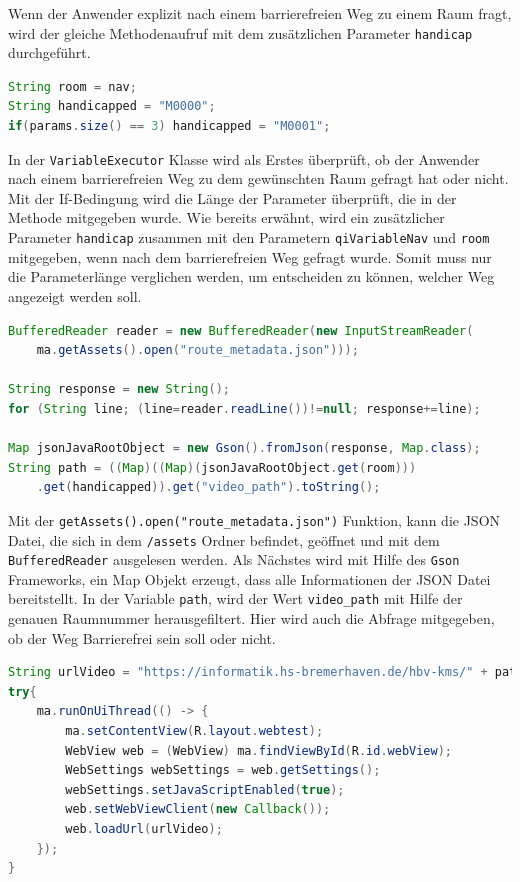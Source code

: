 Wenn der Anwender explizit nach einem barrierefreien Weg zu einem Raum fragt, wird der gleiche Methodenaufruf mit dem zusätzlichen Parameter \verb|handicap| durchgeführt.\\

\begin{lstlisting}[language=Java, caption={Optioanle Barrierefreiheit}]
String room = nav;
String handicapped = "M0000";
if(params.size() == 3) handicapped = "M0001";
\end{lstlisting}


In der \verb|VariableExecutor| Klasse wird als Erstes überprüft, ob der Anwender nach einem barrierefreien Weg zu dem gewünschten Raum gefragt hat oder nicht. Mit der If-Bedingung wird die Länge der Parameter überprüft, die in der Methode mitgegeben wurde. Wie bereits erwähnt, wird ein zusätzlicher Parameter \verb|handicap| zusammen mit den Parametern \verb|qiVariableNav| und \verb|room| mitgegeben, wenn nach dem barrierefreien Weg gefragt wurde. Somit muss nur die Parameterlänge verglichen werden, um entscheiden zu können, welcher Weg angezeigt werden soll.\\

\begin{lstlisting}[language=Java, caption={Auslesen der Routenfinder Daten}]
BufferedReader reader = new BufferedReader(new InputStreamReader(
    ma.getAssets().open("route_metadata.json")));

String response = new String();
for (String line; (line=reader.readLine())!=null; response+=line);

Map jsonJavaRootObject = new Gson().fromJson(response, Map.class);
String path = ((Map)((Map)(jsonJavaRootObject.get(room)))
    .get(handicapped)).get("video_path").toString();
\end{lstlisting}

Mit der \verb|getAssets().open("route_metadata.json")| Funktion, kann die JSON Datei, die sich in dem \verb|/assets| Ordner befindet, geöffnet und mit dem \verb|BufferedReader| ausgelesen werden. Als Nächstes wird mit Hilfe des \verb|Gson| Frameworks, ein Map Objekt erzeugt, dass alle Informationen der JSON Datei bereitstellt. In der Variable \verb|path|, wird der Wert 
\verb|video_path| mit Hilfe der genauen Raumnummer herausgefiltert. Hier wird auch die Abfrage mitgegeben, ob der Weg Barrierefrei sein soll oder nicht.\\


\begin{lstlisting}[language=Java, caption={Darstellung der Wegbeschreibung auf Peppers Tablet}]
String urlVideo = "https://informatik.hs-bremerhaven.de/hbv-kms/" + path;
try{
    ma.runOnUiThread(() -> {
        ma.setContentView(R.layout.webtest);
        WebView web = (WebView) ma.findViewById(R.id.webView);
        WebSettings webSettings = web.getSettings();
        webSettings.setJavaScriptEnabled(true);
        web.setWebViewClient(new Callback());
        web.loadUrl(urlVideo);
    });
}
\end{lstlisting}

